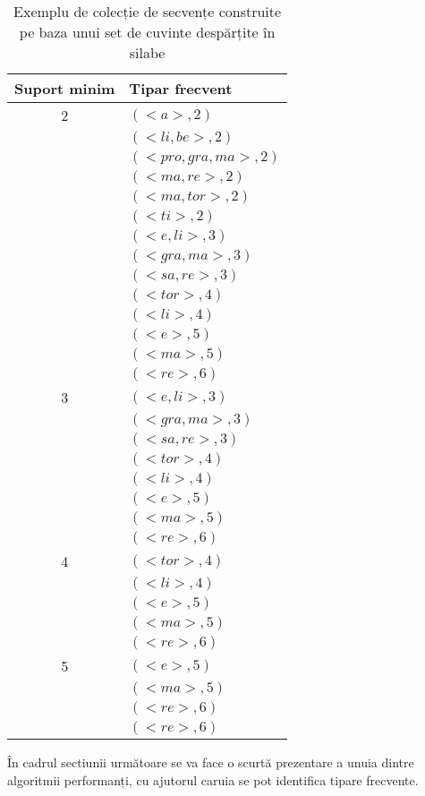 \begin{table}[h!]
\centering    
\begin{tabular}{|c|l|}    
\hline      
Suport minim & Tipar frecvent\\
\hline
2& $(<a>, 2)$  \\
 & $(<li, be>, 2)$  \\
 & $(<pro, gra, ma>, 2)$  \\
 & $(<ma, re>, 2)$  \\
 & $(<ma, tor>, 2)$  \\
 & $(<ti>, 2)$  \\
 & $(<e, li>, 3)$  \\
 & $(<gra, ma>, 3)$  \\
 & $(<sa, re>, 3)$  \\
 & $(<tor>,4)$  \\
 & $(<li>, 4)$  \\
 & $(<e>, 5)$  \\
 & $(<ma>,5)$  \\
 & $(<re>, 6)$  \\
\hline
3& $(<e, li>, 3)$  \\
 & $(<gra, ma>, 3)$  \\
 & $(<sa, re>, 3)$  \\
 & $(<tor>,4)$  \\
 & $(<li>, 4)$  \\
 & $(<e>, 5)$  \\
 & $(<ma>,5)$  \\
 & $(<re>, 6)$  \\
\hline
4& $(<tor>,4)$  \\
 & $(<li>, 4)$  \\
 & $(<e>, 5)$  \\
 & $(<ma>,5)$  \\
 & $(<re>, 6)$  \\
\hline
5& $(<e>, 5)$  \\
 & $(<ma>,5)$  \\
 & $(<re>, 6)$  \\
\hline
 & $(<re>, 6)$  \\
\hline                              
\end{tabular}
\caption{Exemplu de colecție de secvențe construite pe baza unui set de cuvinte despărțite în silabe}
\label{table:sdb_patterns}               
\end{table}

În cadrul sectiunii următoare se va face o scurtă prezentare a unuia dintre algoritmii performanți, cu ajutorul caruia se pot identifica tipare frecvente. 


